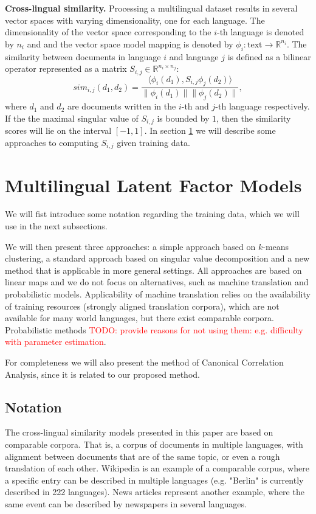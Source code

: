 \documentclass[twoside,11pt]{article}
\newcommand{\todo}[1]{\textcolor{red}{TODO: #1}}
\newcommand{\RR}{\mathbb{R}}
\begin{document}
\textbf {Cross-lingual similarity.}
Processing a multilingual dataset results in several vector spaces with varying dimensionality, one for each language. The dimensionality of the vector space corresponding to the $i$-th language is denoted by $n_i$ and and the vector space model mapping is denoted by $\phi_i : \text{text} \rightarrow \RR^{n_i}$.
The similarity between documents in language $i$ and language $j$ is defined as a bilinear operator represented as a matrix $S_{i,j} \in \RR^{n_i \times n_j}$:
$$sim_{i,j}(d_1, d_2) = \frac{ \langle \phi_i (d_1), S_{i,j} \phi_j (d_2) \rangle }{\|\phi_i(d_1)\| \|\phi_j(d_2)\|},$$
where $d_1$ and $d_2$ are documents written in the $i$-th and $j$-th language respectively. If the the maximal singular value of $S_{i,j}$ is bounded by $1$, then the similarity scores will lie on the interval $[-1, 1]$. In section \ref{sec:models} we will describe some approaches to computing $S_{i,j}$ given training data.

\section{Multilingual Latent Factor Models}\label{sec:models}

We will fist introduce some notation regarding the training data, which we will use in the next subsections.

We will then present three approaches: a simple approach based on $k$-means clustering, a standard approach based on singular value decomposition and a new method that is applicable in more general
settings. All approaches are based on linear maps and we do not focus on alternatives, such as machine translation and probabilistic models. Applicability of machine translation relies
on the availability of training resources (strongly aligned translation corpora), which are not available for many world languages, but there exist comparable corpora. Probabilistic
methods \todo{provide reasons for not using them: e.g. difficulty with parameter estimation}.

For completeness we will also present the method of Canonical Correlation Analysis, since it is related to our proposed method.

\subsection{Notation}

The cross-lingual similarity models presented in this paper are based on comparable corpora. That is, a corpus of documents in multiple languages, with alignment between documents that are of the same topic, or even a rough translation of each other. Wikipedia is an example of a comparable corpus, where a specific entry can be described in multiple languages (e.g. "Berlin" is currently described in 222 languages). News articles represent another example, where the same event can be described by newspapers in several languages.
\end{document}
